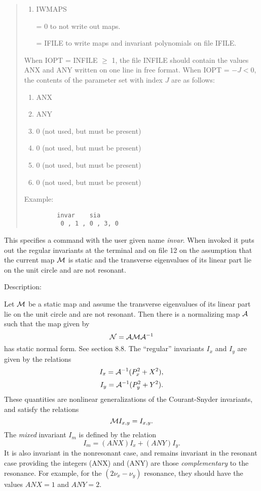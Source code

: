\begin{quotation}
\begin{enumerate}
      \item  IWMAPS

             = 0 to not write out maps.

             = IFILE to write maps and invariant polynomials on file IFILE.
\end{enumerate}
When IOPT = INFILE $\geq$ 1, the file INFILE should contain the values ANX and
ANY written on one line in free format.  When IOPT = $-J < 0$, the contents
of the parameter set with index $J$ are as follows:
\begin{enumerate}
\item ANX
\item ANY
\item 0 (not used, but must be present)
\item 0 (not used, but must be present)
\item 0 (not used, but must be present)
\item 0 (not used, but must be present)
\end{enumerate}

\vspace{5mm}
\noindent     Example:
\begin{verbatim}
         invar    sia
          0 , 1 , 0 , 3, 0
\end{verbatim}
\end{quotation}
This specifies a command with the user given name {\em invar}.  When invoked it puts out the regular invariants at the terminal and on file 12 on the assumption that the current map ${\cal M}$ is static and the transverse eigenvalues of its linear part lie on the unit circle and are not resonant.

\vspace{5mm}
     Description:
\vspace{2mm}

Let ${\cal M}$ be a static map and assume the transverse eigenvalues of its linear part lie on the unit circle and are not resonant.  Then there is a normalizing map ${\cal A}$ such that the map given by
\[
{\cal N} = {\cal A} {\cal M} {\cal A}^{-1}
\]
has static normal form.  See section 8.8.  The ``regular'' invariants $I_x$ and $I_y$  are given by the relations
\[
I_x = {\cal A}^{-1} (P_x^2 + X^2),
\]
\[
I_y = {\cal A}^{-1} (P_y^2 + Y^2).
\]
These quantities are nonlinear generalizations of the Courant-Snyder invariants, and satisfy the relations 
\[
{\cal M} I_{x,y} = I_{x,y}.
\]
The {\em mixed} invariant $I_m$ is defined by the relation
\[
I_m = (ANX) I_x + (ANY) I_y.
\]
It is also invariant in the nonresonant case, and remains invariant in the resonant case providing the integers (ANX) and (ANY) are those {\em complementary} to the resonance.  For example, for the $(2 \nu_x - \nu_y)$ resonance, they should have the values $ANX = 1$ and $ANY = 2$.

